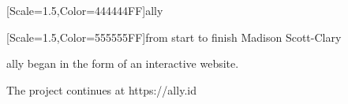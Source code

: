 \documentclass[11pt]{memoir}
\begin{document}
  \frontmatter

  

  \pagestyle{plain}

  \doublespacing

  \null
  \vfill
  \begin{flushright}
    {[Scale=1.5,Color=444444FF]\Huge ally}

    \vfill
    
    {[Scale=1.5,Color=555555FF]\normalsize from start to finish}
    \vfill
    {\Huge Madison Scott-Clary}
  \end{flushright}
  \thispagestyle{empty}

  \newpage

  

  \newpage
  \null
  \thispagestyle{empty}
  \cleardoublepage

  \onehalfspacing

  \null
  \vfill
  \begin{center}
    {\allyFont ally} began in the form of an interactive website.

    The project continues at {\allyFont https://ally.id}
  \end{center}
  \vfill

  \mainmatter

  \pagestyle{ourbook}
  \setlength\columnsep{20pt}
  \twosided
  
  
  
  


  \backmatter
  \pagestyle{empty}
\end{document}
